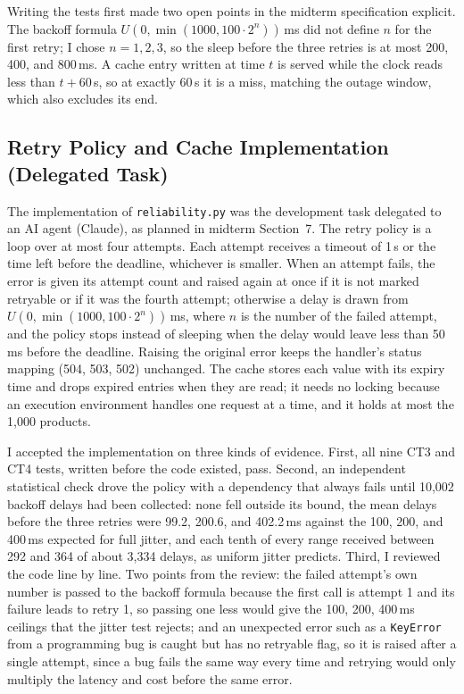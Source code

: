 \documentclass[10pt]{article}
\begin{document}
Writing the tests first made two open points in the midterm specification
explicit. The backoff formula $U(0, \min(1000, 100 \cdot 2^{n}))$\,ms did not
define $n$ for the first retry; I chose $n = 1, 2, 3$, so the sleep before the
three retries is at most 200, 400, and 800\,ms. A cache entry written at time
$t$ is served while the clock reads less than $t + 60$\,s, so at exactly 60\,s
it is a miss, matching the outage window, which also excludes its end.

\subsection{Retry Policy and Cache Implementation (Delegated Task)}
The implementation of \texttt{reliability.py} was the development task
delegated to an AI agent (Claude), as planned in midterm Section~7. The retry
policy is a loop over at most four attempts. Each attempt receives a timeout of
1\,s or the time left before the deadline, whichever is smaller. When an
attempt fails, the error is given its attempt count and raised again at once if
it is not marked retryable or if it was the fourth attempt; otherwise a delay is
drawn from $U(0, \min(1000, 100 \cdot 2^{n}))$\,ms, where $n$ is the number of
the failed attempt, and the policy stops instead of sleeping when the delay would
leave less than 50\,ms before the deadline. Raising the original error keeps the
handler's status mapping (504, 503, 502) unchanged. The cache stores each value
with its expiry time and drops expired entries when they are read; it needs no
locking because an execution environment handles one request at a time, and it
holds at most the 1{,}000 products.

I accepted the implementation on three kinds of evidence. First, all nine CT3
and CT4 tests, written before the code existed, pass. Second, an independent
statistical check drove the policy with a dependency that always fails until
10{,}002 backoff delays had been collected: none fell outside its bound, the
mean delays before the three retries were 99.2, 200.6, and 402.2\,ms against
the 100, 200, and 400\,ms expected for full jitter, and each tenth of every
range received between 292 and 364 of about 3{,}334 delays, as uniform jitter
predicts. Third, I reviewed the code line by line. Two points from the review:
the failed attempt's own number is passed to the backoff formula because the
first call is attempt 1 and its failure leads to retry 1, so passing one less
would give the 100, 200, 400\,ms ceilings that the jitter test rejects; and an
unexpected error such as a \texttt{KeyError} from a programming bug is caught
but has no retryable flag, so it is raised after a single attempt, since a bug
fails the same way every time and retrying would only multiply the latency and
cost before the same error.
\end{document}
